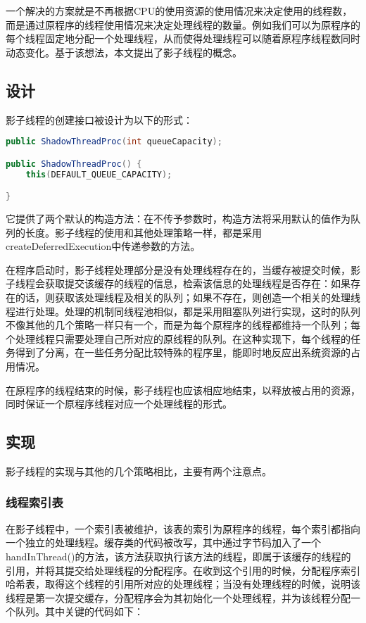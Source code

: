 一个解决的方案就是不再根据CPU的使用资源的使用情况来决定使用的线程数，而是通过原程序的线程使用情况来决定处理线程的数量。例如我们可以为原程序的每个线程固定地分配一个处理线程，从而使得处理线程可以随着原程序线程数同时动态变化。基于该想法，本文提出了影子线程的概念。

\subsection{设计}

影子线程的创建接口被设计为以下的形式：

\begin{lstlisting}[language=Java]
public ShadowThreadProc(int queueCapacity);

public ShadowThreadProc() {
	this(DEFAULT_QUEUE_CAPACITY);

}
\end{lstlisting}

它提供了两个默认的构造方法：在不传予参数时，构造方法将采用默认的值作为队列的长度。影子线程的使用和其他处理策略一样，都是采用createDeferredExecution中传递参数的方法。

在程序启动时，影子线程处理部分是没有处理线程存在的，当缓存被提交时候，影子线程会获取提交该缓存的线程的信息，检索该信息的处理线程是否存在：如果存在的话，则获取该处理线程及相关的队列；如果不存在，则创造一个相关的处理线程进行处理。处理的机制同线程池相似，都是采用阻塞队列进行实现，这时的队列不像其他的几个策略一样只有一个，而是为每个原程序的线程都维持一个队列；每个处理线程只需要处理自己所对应的原线程的队列。在这种实现下，每个线程的任务得到了分离，在一些任务分配比较特殊的程序里，能即时地反应出系统资源的占用情况。

在原程序的线程结束的时候，影子线程也应该相应地结束，以释放被占用的资源，同时保证一个原程序线程对应一个处理线程的形式。

\subsection{实现}

影子线程的实现与其他的几个策略相比，主要有两个注意点。

\subsubsection{线程索引表}

在影子线程中，一个索引表被维护，该表的索引为原程序的线程，每个索引都指向一个独立的处理线程。缓存类的代码被改写，其中通过字节码加入了一个handInThread()的方法，该方法获取执行该方法的线程，即属于该缓存的线程的引用，并将其提交给处理线程的分配程序。在收到这个引用的时候，分配程序索引哈希表，取得这个线程的引用所对应的处理线程；当没有处理线程的时候，说明该线程是第一次提交缓存，分配程序会为其初始化一个处理线程，并为该线程分配一个队列。其中关键的代码如下：


